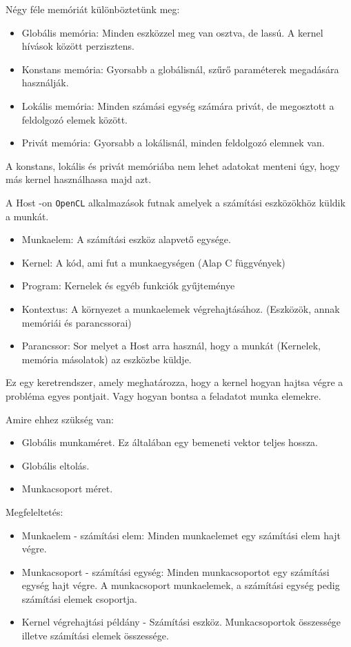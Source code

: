 Négy féle memóriát különböztetünk meg:
\begin{itemize}
\item Globális memória: Minden eszközzel meg van osztva, de lassú. A kernel hívások között perzisztens. 
\item Konstans memória: Gyorsabb a globálisnál, szűrő paraméterek megadására használják.
\item Lokális memória: Minden számási egység számára privát, de megosztott a feldolgozó elemek között.
\item Privát memória: Gyorsabb a lokálisnál, minden feldolgozó elemnek van.
\end{itemize} 
A konstans, lokális és privát memóriába nem lehet adatokat menteni úgy, hogy más kernel használhassa majd azt.


A Host -on \texttt{OpenCL} alkalmazások futnak amelyek a számítási eszközökhöz küldik a munkát.
\begin{itemize}
\item Munkaelem: A számítási eszköz alapvető egysége.
\item Kernel: A kód, ami fut a munkaegységen  (Alap C függvények)
\item Program: Kernelek és egyéb funkciók gyűjteménye
\item Kontextus: A környezet a munkaelemek végrehajtásához. (Eszközök, annak memóriái és parancssorai)
\item Parancssor: Sor melyet a Host arra használ, hogy a munkát (Kernelek, memória másolatok) az eszközbe küldje.
\end{itemize}

Ez egy keretrendszer, amely meghatározza, hogy a kernel hogyan hajtsa végre a probléma egyes pontjait. Vagy hogyan bontsa a feladatot munka elemekre.

Amire ehhez szükség van:
\begin{itemize}
\item Globális munkaméret. Ez általában egy bemeneti vektor teljes hossza.
\item Globális eltolás.
\item Munkacsoport méret.
\end{itemize}
Megfeleltetés:
\begin{itemize}
\item Munkaelem - számítási elem: Minden munkaelemet egy számítási elem hajt végre.
\item Munkacsoport - számítási egység: Minden munkacsoportot egy számítási egység hajt végre. A munkacsoport munkaelemek, a számítási egység pedig számítási elemek csoportja.
\item Kernel végrehajtási példány - Számítási eszköz. Munkacsoportok összessége illetve számítási elemek összessége. 
\end{itemize}

